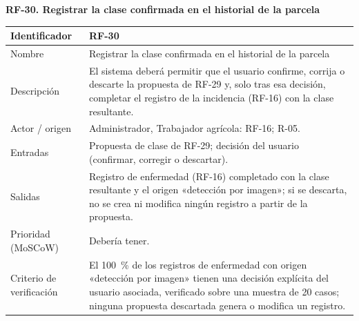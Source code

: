 \documentclass[12pt,a4paper]{article}
\begin{document}
\begin{minipage}{\linewidth}
\bigskip
\noindent\textbf{RF-30. Registrar la clase confirmada en el historial de la parcela}
\label{tab:RF-30}

\begin{center}
\begin{tabular}{|p{3.5cm}|p{10.7cm}|}
\hline
Identificador & RF-30 \\
\hline
Nombre & Registrar la clase confirmada en el historial de la parcela \\
\hline
Descripción & El sistema deberá permitir que el usuario confirme, corrija o descarte la propuesta de RF-29 y, solo tras esa decisión, completar el registro de la incidencia (RF-16) con la clase resultante. \\
\hline
Actor / origen & Administrador, Trabajador agrícola: RF-16; R-05. \\
\hline
Entradas & Propuesta de clase de RF-29; decisión del usuario (confirmar, corregir o descartar). \\
\hline
Salidas & Registro de enfermedad (RF-16) completado con la clase resultante y el origen «detección por imagen»; si se descarta, no se crea ni modifica ningún registro a partir de la propuesta. \\
\hline
Prioridad (MoSCoW) & Debería tener. \\
\hline
Criterio de verificación & El 100~\% de los registros de enfermedad con origen «detección por imagen» tienen una decisión explícita del usuario asociada, verificado sobre una muestra de 20 casos; ninguna propuesta descartada genera o modifica un registro. \\
\hline
\end{tabular}
\end{center}
\end{minipage}
\end{document}
